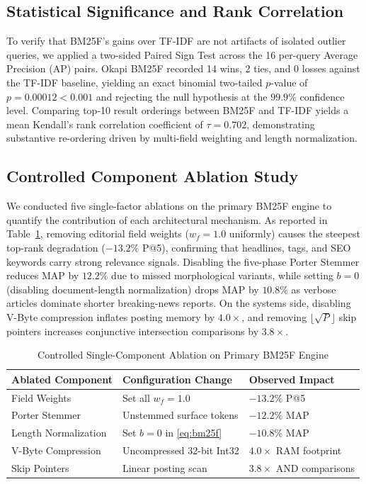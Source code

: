 \documentclass[conference]{IEEEtran}
\begin{document}
\subsection{Statistical Significance and Rank Correlation}
To verify that BM25F's gains over TF-IDF are not artifacts of isolated outlier queries, we applied a two-sided Paired Sign Test across the 16 per-query Average Precision (AP) pairs. Okapi BM25F recorded 14 wins, 2 ties, and 0 losses against the TF-IDF baseline, yielding an exact binomial two-tailed $p$-value of $p = 0.00012 < 0.001$ and rejecting the null hypothesis at the $99.9\%$ confidence level. Comparing top-10 result orderings between BM25F and TF-IDF yields a mean Kendall's rank correlation coefficient of $\tau = 0.702$, demonstrating substantive re-ordering driven by multi-field weighting and length normalization.

\subsection{Controlled Component Ablation Study}
We conducted five single-factor ablations on the primary BM25F engine to quantify the contribution of each architectural mechanism. As reported in Table~\ref{tab:ablation}, removing editorial field weights ($w_f = 1.0$ uniformly) causes the steepest top-rank degradation ($-13.2\%$ P@5), confirming that headlines, tags, and SEO keywords carry strong relevance signals. Disabling the five-phase Porter Stemmer reduces MAP by $12.2\%$ due to missed morphological variants, while setting $b = 0$ (disabling document-length normalization) drops MAP by $10.8\%$ as verbose articles dominate shorter breaking-news reports. On the systems side, disabling V-Byte compression inflates posting memory by $4.0\times$, and removing $\lfloor\sqrt{P}\rfloor$ skip pointers increases conjunctive intersection comparisons by $3.8\times$.

\begin{table}[htbp]
\caption{Controlled Single-Component Ablation on Primary BM25F Engine}
\begin{center}
\setlength{\tabcolsep}{5pt}
\renewcommand{\arraystretch}{1.15}
\begin{tabular}{@{}lll@{}}
\toprule
\textbf{Ablated Component} & \textbf{Configuration Change} & \textbf{Observed Impact} \\
\midrule
Field Weights & Set all $w_f = 1.0$ & $-13.2\%$ P@5 \\
Porter Stemmer & Unstemmed surface tokens & $-12.2\%$ MAP \\
Length Normalization & Set $b = 0$ in \eqref{eq:bm25f} & $-10.8\%$ MAP \\
V-Byte Compression & Uncompressed 32-bit Int32 & $4.0\times$ RAM footprint \\
Skip Pointers & Linear posting scan & $3.8\times$ AND comparisons \\
\bottomrule
\end{tabular}
\label{tab:ablation}
\end{center}
\end{table}
\end{document}
